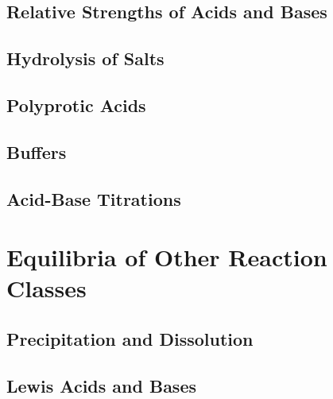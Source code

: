 \documentclass[12pt, openany, letterpaper]{memoir}
\begin{document}
\section{Relative Strengths of Acids and Bases}

\section{Hydrolysis of Salts}

\section{Polyprotic Acids}

\section{Buffers}

\section{Acid-Base Titrations}

\chapter{Equilibria of Other Reaction Classes}

\section{Precipitation and Dissolution}

\section{Lewis Acids and Bases}
\end{document}
